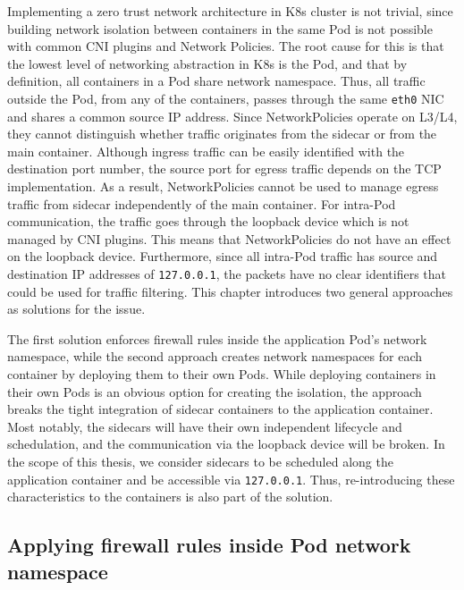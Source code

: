 \documentclass[english, 12pt, a4paper, sci, utf8, a-2b, online]{aaltothesis}
\begin{document}
Implementing a zero trust network architecture in K8s cluster is not trivial, since building network isolation between containers in the same Pod is not possible with common CNI plugins and Network Policies. The root cause for this is that the lowest level of networking abstraction in K8s is the Pod, and that by definition, all containers in a Pod share network namespace. Thus, all traffic outside the Pod, from any of the containers, passes through the same \texttt{eth0} NIC and shares a common source IP address. Since NetworkPolicies operate on L3/L4, they cannot distinguish whether traffic originates from the sidecar or from the main container. Although ingress traffic can be easily identified with the destination port number, the source port for egress traffic depends on the TCP implementation. As a result, NetworkPolicies cannot be used to manage egress traffic from sidecar independently of the main container. For intra-Pod communication, the traffic goes through the loopback device which is not managed by CNI plugins. This means that NetworkPolicies do not have an effect on the loopback device. Furthermore, since all intra-Pod traffic has source and destination IP addresses of \texttt{127.0.0.1}, the packets have no clear identifiers that could be used for traffic filtering. This chapter introduces two general approaches as solutions for the issue.

The first solution enforces firewall rules inside the application Pod's network namespace, while the second approach creates network namespaces for each container by deploying them to their own Pods. While deploying containers in their own Pods is an obvious option for creating the isolation, the approach breaks the tight integration of sidecar containers to the application container. Most notably, the sidecars will have their own independent lifecycle and schedulation, and the communication via the loopback device will be broken. In the scope of this thesis, we consider sidecars to be scheduled along the application container and be accessible via \texttt{127.0.0.1}. Thus, re-introducing these characteristics to the containers is also part of the solution.

\subsection{Applying firewall rules inside Pod network namespace}

\end{document}
